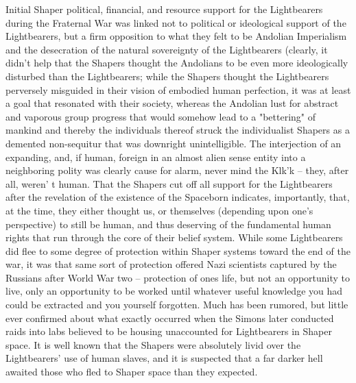 Initial Shaper political, financial, and resource support for the
Lightbearers during the Fraternal War was linked not to political or
ideological support of the Lightbearers, but a firm opposition to what
they felt to be Andolian Imperialism and the desecration of the
natural sovereignty of the Lightbearers (clearly, it
didn't help that the Shapers thought the Andolians to be even more
ideologically disturbed than the Lightbearers; while the Shapers
thought the Lightbearers perversely misguided in their vision of
embodied human perfection, it was at least a goal that resonated with
their society, whereas the Andolian lust for abstract and vaporous
group progress that would somehow lead to a "bettering" of mankind
and thereby the individuals thereof struck the individualist Shapers
as a demented non-sequitur that was downright unintelligible. The
interjection of an expanding, and, if human, foreign in an almost
alien sense entity into a neighboring polity was clearly cause for
alarm, never mind the Klk'k -- they, after all, weren'
t human. That the Shapers cut off all support for the Lightbearers
after the revelation of the existence of the Spaceborn indicates,
importantly, that, at the time, they either thought us, or themselves
(depending upon one's perspective) to still be human, and thus
deserving of the fundamental human rights that run through the core of
their belief system. While some Lightbearers did flee to some degree
of protection within Shaper systems toward the end of the war, it was
that same sort of protection offered Nazi scientists captured by the
Russians after World War two -- protection of ones
life, but not an opportunity to live, only an opportunity to be worked
until whatever useful knowledge you had could be extracted and you
yourself forgotten. Much has been rumored, but little ever confirmed
about what exactly occurred when the Simons later conducted raids into
labs believed to be housing unaccounted for Lightbearers in Shaper
space. It is well known that the Shapers were absolutely livid over
the Lightbearers' use of human slaves, and it is suspected that a far
darker hell awaited those who fled to Shaper space than they expected.

